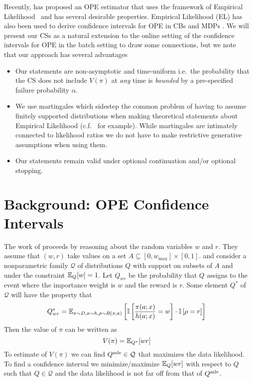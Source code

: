 Recently, \cite{kallus} has proposed an OPE estimator that uses
the framework of Empirical Likelihood~\cite{owen} and has several
desirable properties. Empirical Likelihood (EL) has also been used to 
derive confidence intervals for OPE in CBs \cite{klm} 
and MDPs \cite{dai}. We will present our CSs as a natural 
extension to the online setting of the confidence intervals 
for OPE in the batch setting to draw some connections, but 
we note that our approach has several advantages
\begin{itemize}
\item Our statements are non-asymptotic and time-uniform i.e.\ the probability 
that the CS does not include $V(\pi)$ at \emph{any} time is \emph{bounded}
by a pre-specified failure probability $\alpha$.
\item We use martingales which sidestep the common problem 
of having to assume finitely supported distributions when making theoretical statements about Empirical Likelihood 
(c.f.~\cite{klucb} for example). While martingales
are intimately connected to likelihood ratios \cite{ramdas-super-duper} 
we do not have to make restrictive generative assumptions
when using them.
\item Our statements remain valid under optional continuation and/or optional stopping.
\end{itemize}

\section{Background: OPE Confidence Intervals}
The work of \cite{klm} proceeds by 
reasoning about the random variables $w$ and $r$.
They assume that $(w,r)$ take values on a set
$A\subseteq [0,w_{\max}]\times [0,1]$. 
and consider a 
nonparametric family $\mathcal{Q}$ of distributions  $Q$
with support on subsets of $A$ and under the 
constraint $\mathbb{E}_Q[w]=1$. Let $Q_{wr}$ be 
the probability that $Q$ assigns to the event
where the importance weight is $w$ and the
reward is $r$. Some element $Q^*$ 
of $\mathcal{Q}$ will have the property that
\[
Q^*_{wr}=\mathbb{E}_{x\sim D,a\sim h,\rho\sim R(x,a)}
\left[
\mathbb{I}\left[\frac{\pi(a;x)}{h(a;x)}=w\right]\cdot
\mathbb{I}\left[\rho=r\right]
\right]
\]
Then the value of $\pi$ can be written as
\[
V(\pi)=\mathbb{E}_{Q^*}[wr]
\]
To estimate of $V(\pi)$ we can find 
$Q^{\textrm{mle}} \in \mathcal{Q}$ that maximizes
the data likelihood. To find a confidence interval
we minimize/maximize $\mathbb{E}_Q[wr]$ with respect to $Q$ 
such that $Q \in \mathcal{Q}$ and the data likelihood 
is not far off from that of $Q^{\textrm{mle}}$.

